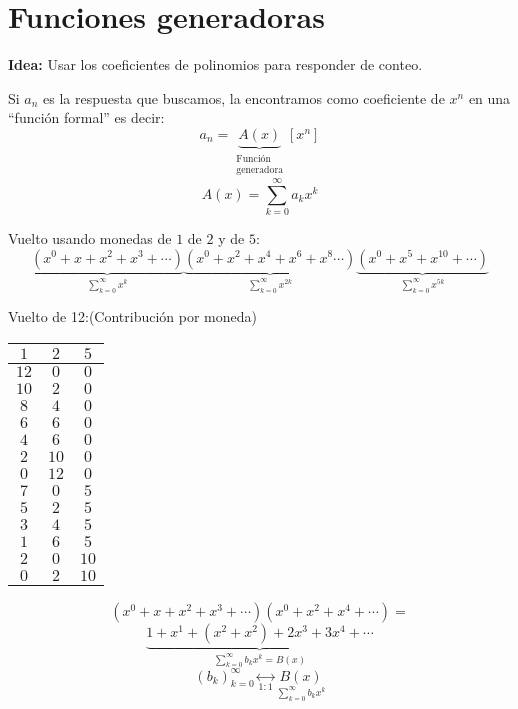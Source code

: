 \documentclass[../main.tex]{subfiles}
\begin{document}
\chapter{Funciones generadoras}%

\thispagestyle{fancy}

\textbf{Idea:} Usar los coeficientes de polinomios para responder
 de conteo.

Si $a_n$ es la respuesta que buscamos, la encontramos como coeficiente de $x^n$
en una ``función formal'' es decir:
\[
	a_n =
	\underbrace
	{
		A(x)
	}_
	{
		\substack
		{
			\text{Función}\\
			\text{generadora}
		}
	}
	[x^n]
\]
\[
	A(x) = \sum_{k=0}^\infty a_kx^k
\]

Vuelto usando monedas de $1$ de $2$ y de $5$:
\[
	\underbrace
	{
		(x^0+x+x^2+x^3+\cdots)
	}_
	{
		\sum_{k=0}^\infty x^k
	}
	\underbrace
	{
		(x^0+x^2+x^4+x^6+x^8\cdots)
	}_
	{
		\sum_{k=0}^\infty x^{2k}
	}
	\underbrace
	{
		(x^0+x^5+x^{10}+\cdots)
	}_
	{
		\sum_{k=0}^\infty x^{5k}
	}
\]

Vuelto de 12:(Contribución por moneda)
\begin{table}[H]
	\centering
	\begin{tabular}{|c|c|c|}
		$1$ & $2$ & $5$\\
		\hline
		$12$ & $0$ & $0$\\
		$10$ & $2$ & $0$\\
		$8$ & $4$ & $0$\\
		$6$ & $6$ & $0$\\
		$4$ & $6$ & $0$\\
		$2$ & $10$ & $0$\\
		$0$ & $12$ & $0$\\
		\hline
		$7$ & $0$ & $5$\\
		$5$ & $2$ & $5$\\
		$3$ & $4$ & $5$\\
		$1$ & $6$ & $5$\\
		\hline
		$2$ & $0$ & $10$\\
		$0$ & $2$ & $10$\\
	\end{tabular}
\end{table}
\[
	(x^0+x+x^2+x^3+\cdots)
	(x^0+x^2+x^4+\cdots)=
\]
\[
	\underbrace
	{
		1+x^1+(x^2+x^2)+2x^3+3x^4+\cdots
	}_
	{
		\sum_{k=0}^\infty b_k x^k = B(x)
	}
\]
\[
	(b_k)_{k=0}^\infty \underset{1:1}{\longleftrightarrow}
	\underset{\sum_{k=0}^\infty b_kx^k}{B(x)}
\]
\end{document}
